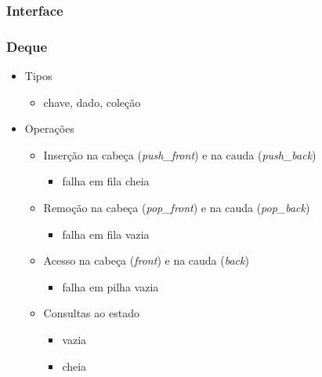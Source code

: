 \documentclass{beamer}
\begin{document}
\begin{frame}
  \frametitle{Interface}
  \frametitle{Deque}

  \begin{itemize}
    \item Tipos
      \begin{itemize}
        \item chave, dado, coleção
      \end{itemize}
    \item Operações
      \begin{itemize}
        \item Inserção na cabeça (\textit{push\_front\/}) e na cauda (\textit{push\_back\/})
          \begin{itemize}
            \item falha em fila cheia
          \end{itemize}
        \item Remoção na cabeça (\textit{pop\_front\/}) e na cauda (\textit{pop\_back\/})
          \begin{itemize}
            \item falha em fila vazia
          \end{itemize}
        \item Acesso na cabeça (\textit{front\/}) e na cauda (\textit{back\/})
          \begin{itemize}
            \item falha em pilha vazia
          \end{itemize}
        \item Consultas ao estado
          \begin{itemize}
          \item vazia
          \item cheia
          \end{itemize}
      \end{itemize}
  \end{itemize}
\end{frame}
\end{document}
